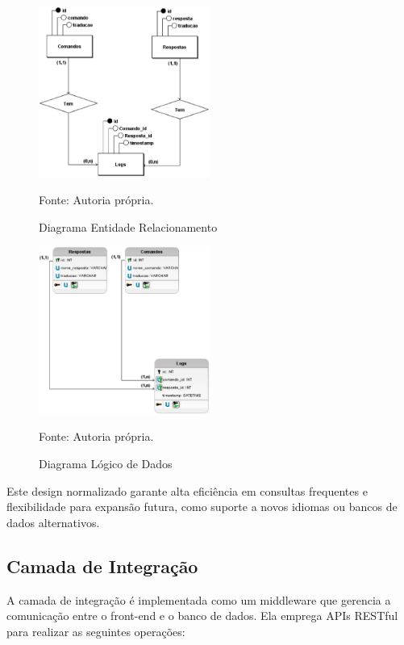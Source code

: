 \begin{figure}[H]
    \centering
    \includegraphics[width=0.5\textwidth]{figuras/Conceitual_1.eps}
    \caption{Diagrama Entidade Relacionamento}
    Fonte: Autoria própria.
    \label{fig:Diagrama Entidade Relacionamento}
\end{figure}

\begin{figure}[H]
    \centering
    \includegraphics[width=0.5\textwidth]{figuras/Logico_1.eps}
    \caption{Diagrama Lógico de Dados}
    Fonte: Autoria própria.
    \label{fig:Diagrama Logico de Dados}
\end{figure}

Este design normalizado garante alta eficiência em consultas frequentes e flexibilidade para expansão futura, como suporte a novos idiomas ou bancos de dados alternativos.

\subsection{Camada de Integração}
A camada de integração é implementada como um middleware que gerencia a comunicação entre o front-end e o banco de dados. Ela emprega APIs RESTful para realizar as seguintes operações:

